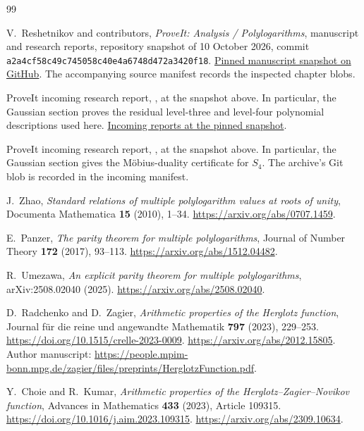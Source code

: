 \begin{thebibliography}{99}
\raggedright
{}

V.~Reshetnikov and contributors, \emph{ProveIt: Analysis / Polylogarithms},
manuscript and research reports, repository snapshot of 10 October 2026,
commit \texttt{a2a4cf58c49c745058c40e4a6748d472a3420f18}.
\href{https://github.com/VladimirReshetnikov/ProveIt/tree/a2a4cf58c49c745058c40e4a6748d472a3420f18/Analysis/Polylogarithms/docs/manuscript}{Pinned manuscript snapshot on GitHub}.
The accompanying source manifest records the inspected chapter blobs.

ProveIt incoming research report,
, at the snapshot above.
In particular, the Gaussian section proves the residual level-three
and level-four polynomial descriptions used here.
\href{https://github.com/VladimirReshetnikov/ProveIt/tree/a2a4cf58c49c745058c40e4a6748d472a3420f18/Analysis/Polylogarithms/docs/incoming}{Incoming reports at the pinned snapshot}.

ProveIt incoming research report,
, at the snapshot above.
In particular, the Gaussian section gives the Möbius-duality certificate
for $S_4$. The archive's Git blob is recorded in the incoming manifest.

J.~Zhao, \emph{Standard relations of multiple polylogarithm values at
roots of unity}, Documenta Mathematica \textbf{15} (2010), 1--34.
\url{https://arxiv.org/abs/0707.1459}.

E.~Panzer, \emph{The parity theorem for multiple polylogarithms},
Journal of Number Theory \textbf{172} (2017), 93--113.
\url{https://arxiv.org/abs/1512.04482}.

R.~Umezawa, \emph{An explicit parity theorem for multiple polylogarithms},
arXiv:2508.02040 (2025).
\url{https://arxiv.org/abs/2508.02040}.

D.~Radchenko and D.~Zagier,
\emph{Arithmetic properties of the Herglotz function},
Journal für die reine und angewandte Mathematik \textbf{797} (2023),
229--253.
\url{https://doi.org/10.1515/crelle-2023-0009}.
\url{https://arxiv.org/abs/2012.15805}.
Author manuscript:
\url{https://people.mpim-bonn.mpg.de/zagier/files/preprints/HerglotzFunction.pdf}.

Y.~Choie and R.~Kumar,
\emph{Arithmetic properties of the Herglotz--Zagier--Novikov function},
Advances in Mathematics \textbf{433} (2023), Article 109315.
\url{https://doi.org/10.1016/j.aim.2023.109315}.
\url{https://arxiv.org/abs/2309.10634}.


\end{thebibliography}
